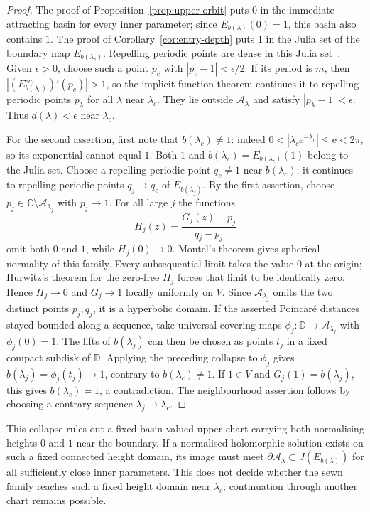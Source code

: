 \documentclass[11pt]{amsart}
\theoremstyle{definition}
\newcommand{\eee}{\mathrm{e}}
\begin{document}
\begin{proof}
The proof of Proposition~\ref{prop:upper-orbit} puts $0$ in the
immediate attracting basin for every inner parameter; since
$E_{b(\lambda)}(0)=1$, this basin also contains $1$.  The proof of
Corollary~\ref{cor:entry-depth} puts $1$ in the Julia set of the
boundary map $E_{b(\lambda_c)}$.  Repelling periodic points are dense
in this Julia set~\cite[Thm.~4]{Bergweiler1993}.  Given $\epsilon>0$,
choose such a point $p_c$ with $|p_c-1|<\epsilon/2$.
If its period is $m$, then
$|(E_{b(\lambda_c)}^{\circ m})'(p_c)|>1$, so the implicit-function
theorem continues it to repelling periodic points $p_\lambda$ for
all $\lambda$ near $\lambda_c$.  They lie outside
$\mathcal A_\lambda$ and satisfy $|p_\lambda-1|<\epsilon$.
Thus $d(\lambda)<\epsilon$ near $\lambda_c$.

For the second assertion, first note that $b(\lambda_c)\ne1$: indeed
$0<|\lambda_c\eee^{-\lambda_c}|\le\eee<2\pi$, so its exponential
cannot equal $1$.  Both $1$ and $b(\lambda_c)=E_{b(\lambda_c)}(1)$
belong to the Julia set.  Choose a repelling periodic point
$q_c\ne1$ near $b(\lambda_c)$; it continues to repelling periodic
points $q_j\to q_c$ of $E_{b(\lambda_j)}$.
By the first assertion, choose
$p_j\in\mathbb C\setminus\mathcal A_{\lambda_j}$ with $p_j\to1$.
For all large $j$ the functions
\[
 H_j(z)=\frac{G_j(z)-p_j}{q_j-p_j}
\]
omit both $0$ and $1$, while $H_j(0)\to0$.
Montel's theorem gives spherical normality of this family.  Every
subsequential limit takes the value $0$ at the origin; Hurwitz's theorem
for the zero-free $H_j$ forces that limit to be identically zero.
Hence $H_j\to0$ and $G_j\to1$ locally uniformly on $V$.
Since $\mathcal A_{\lambda_j}$ omits the two distinct points
$p_j,q_j$, it is a hyperbolic domain.
If the asserted Poincar\'e distances stayed bounded along a sequence,
take universal covering maps
$\phi_j:\mathbb D\to\mathcal A_{\lambda_j}$ with $\phi_j(0)=1$.
The lifts of $b(\lambda_j)$ can then be chosen as points $t_j$ in a
fixed compact subdisk of $\mathbb D$.  Applying the preceding collapse
to $\phi_j$ gives
$b(\lambda_j)=\phi_j(t_j)\to1$, contrary to $b(\lambda_c)\ne1$.
If $1\in V$ and $G_j(1)=b(\lambda_j)$, this gives
$b(\lambda_c)=1$, a contradiction.  The neighbourhood assertion follows
by choosing a contrary sequence $\lambda_j\to\lambda_c$.
\end{proof}

This collapse rules out a fixed basin-valued upper chart carrying
both normalising heights $0$ and $1$ near the boundary.  If a normalised
holomorphic solution exists on such a fixed connected height domain,
its image must meet
$\partial\mathcal A_\lambda\subset J(E_{b(\lambda)})$
for all sufficiently close inner parameters.  This does not
decide whether the sewn family reaches such a fixed height domain
near $\lambda_c$; continuation through another chart remains possible.
\end{document}
